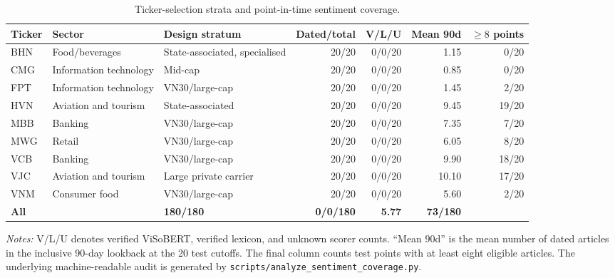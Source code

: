 \begin{table}[htbp]
\centering
\caption{Ticker-selection strata and point-in-time sentiment coverage.}
\label{tab:ticker_sentiment_coverage}
\scriptsize
\renewcommand{\arraystretch}{1.12}
\begin{tabularx}{\textwidth}{|l|>{\raggedright\arraybackslash}p{2.1cm}|X|r|r|r|r|}
\hline
\textbf{Ticker} & \textbf{Sector} & \textbf{Design stratum} &
\textbf{Dated/total} & \textbf{V/L/U} & \textbf{Mean 90d} & \textbf{$\geq 8$ points} \\
\hline
BHN & Food/beverages & State-associated, specialised & 20/20 & 0/0/20 & 1.15 & 0/20 \\
\hline
CMG & Information technology & Mid-cap & 20/20 & 0/0/20 & 0.85 & 0/20 \\
\hline
FPT & Information technology & VN30/large-cap & 20/20 & 0/0/20 & 1.45 & 2/20 \\
\hline
HVN & Aviation and tourism & State-associated & 20/20 & 0/0/20 & 9.45 & 19/20 \\
\hline
MBB & Banking & VN30/large-cap & 20/20 & 0/0/20 & 7.35 & 7/20 \\
\hline
MWG & Retail & VN30/large-cap & 20/20 & 0/0/20 & 6.05 & 8/20 \\
\hline
VCB & Banking & VN30/large-cap & 20/20 & 0/0/20 & 9.90 & 18/20 \\
\hline
VJC & Aviation and tourism & Large private carrier & 20/20 & 0/0/20 & 10.10 & 17/20 \\
\hline
VNM & Consumer food & VN30/large-cap & 20/20 & 0/0/20 & 5.60 & 2/20 \\
\hline
\textbf{All} & \multicolumn{2}{l|}{\textbf{Nine-symbol purposive sample}} &
\textbf{180/180} & \textbf{0/0/180} & \textbf{5.77} & \textbf{73/180} \\
\hline
\end{tabularx}
\begin{flushleft}
\footnotesize \textit{Notes:} V/L/U denotes verified ViSoBERT, verified lexicon,
and unknown scorer counts. ``Mean 90d'' is the mean number of dated articles in
the inclusive 90-day lookback at the 20 test cutoffs. The final column counts
test points with at least eight eligible articles. The underlying machine-readable
audit is generated by \texttt{scripts/analyze\_sentiment\_coverage.py}.
\end{flushleft}
\end{table}

